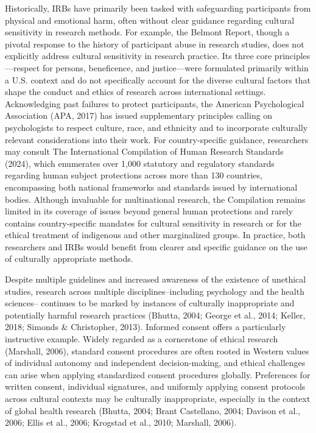 \documentclass[
  11pt,
]{book}
\begin{document}
Historically, IRBs have primarily been tasked with safeguarding participants from physical and emotional harm, often without clear guidance regarding cultural sensitivity in research methods. For example, the Belmont Report, though a pivotal response to the history of participant abuse in research studies, does not explicitly address cultural sensitivity in research practice. Its three core principles---respect for persons, beneficence, and justice---were formulated primarily within a U.S. context and do not specifically account for the diverse cultural factors that shape the conduct and ethics of research across international settings. Acknowledging past failures to protect participants, the American Psychological Association (APA, 2017) has issued supplementary principles calling on psychologists to respect culture, race, and ethnicity and to incorporate culturally relevant considerations into their work. For country-specific guidance, researchers may consult The International Compilation of Human Research Standards (2024), which enumerates over 1,000 statutory and regulatory standards regarding human subject protections across more than 130 countries, encompassing both national frameworks and standards issued by international bodies. Although invaluable for multinational research, the Compilation remains limited in its coverage of issues beyond general human protections and rarely contains country-specific mandates for cultural sensitivity in research or for the ethical treatment of indigenous and other marginalized groups. In practice, both researchers and IRBs would benefit from clearer and specific guidance on the use of culturally appropriate methods.

Despite multiple guidelines and increased awareness of the existence of unethical studies, research across multiple disciplines--including psychology and the health sciences-- continues to be marked by instances of culturally inappropriate and potentially harmful research practices (Bhutta, 2004; George et al., 2014; Keller, 2018; Simonds \& Christopher, 2013). Informed consent offers a particularly instructive example. Widely regarded as a cornerstone of ethical research (Marshall, 2006), standard consent procedures are often rooted in Western values of individual autonomy and independent decision-making, and ethical challenges can arise when applying standardized consent procedures globally. Preferences for written consent, individual signatures, and uniformly applying consent protocols across cultural contexts may be culturally inappropriate, especially in the context of global health research (Bhutta, 2004; Brant Castellano, 2004; Davison et al., 2006; Ellis et al., 2006; Krogstad et al., 2010; Marshall, 2006).
\end{document}
